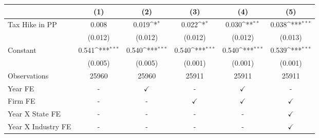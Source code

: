 {
\def\sym#1{\ifmmode^{#1}\else\(^{#1}\)\fi}
\begin{tabular}{l*{5}{c}}
\toprule
                    &\multicolumn{1}{c}{(1)}         &\multicolumn{1}{c}{(2)}         &\multicolumn{1}{c}{(3)}         &\multicolumn{1}{c}{(4)}         &\multicolumn{1}{c}{(5)}         \\
\midrule
Tax Hike in PP      &       0.008         &       0.019\sym{*}  &       0.022\sym{*}  &       0.030\sym{**} &       0.038\sym{***}\\
                    &     (0.012)         &     (0.012)         &     (0.012)         &     (0.012)         &     (0.013)         \\
Constant            &       0.541\sym{***}&       0.540\sym{***}&       0.540\sym{***}&       0.540\sym{***}&       0.539\sym{***}\\
                    &     (0.005)         &     (0.005)         &     (0.001)         &     (0.001)         &     (0.001)         \\
\midrule
Observations        &       25960         &       25960         &       25911         &       25911         &       25911         \\
Year FE             &           -         &$\checkmark$         &           -         &$\checkmark$         &           -         \\
Firm FE             &           -         &           -         &$\checkmark$         &$\checkmark$         &$\checkmark$         \\
Year X State FE     &           -         &           -         &           -         &           -         &$\checkmark$         \\
Year X Industry FE  &           -         &           -         &           -         &           -         &$\checkmark$         \\
\bottomrule
\end{tabular}
}

